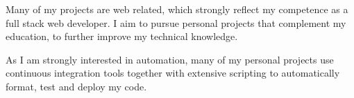 
Many of my projects are web related, which strongly reflect my competence as a full stack web developer. I aim to pursue personal projects that complement my education, to further improve my technical knowledge.

\hfill\break

As I am strongly interested in automation, many of my personal projects use continuous integration tools together with extensive scripting to automatically format, test and deploy my code.
